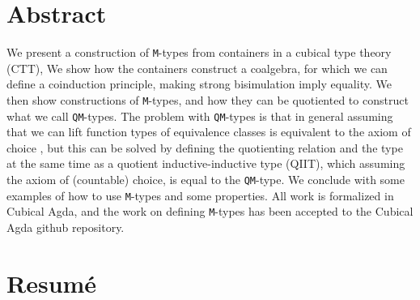 \documentclass[twoside,11pt,openright]{report}
\theoremstyle{plain} %
\theoremstyle{definition}
\theoremstyle{remark}
\begin{document}

\pagestyle{empty} 
\vspace*{\fill}
\clearpage


\pagestyle{plain}
\chapter*{Abstract}

We present a construction of \texttt{M}-types from containers in a cubical type theory (CTT), We show how the containers construct a coalgebra, for which we can define a coinduction principle, making strong bisimulation imply equality. We then show constructions of \texttt{M}-types, and how they can be quotiented to construct what we call \texttt{QM}-types. The problem with \texttt{QM}-types is that in general assuming that we can lift function types of equivalence classes is equivalent to the axiom of choice \cite{DBLP:tt-in-tt}, but this can be solved by defining the quotienting relation and the type at the same time as a quotient inductive-inductive type (QIIT), which assuming the axiom of (countable) choice, is equal to the \texttt{QM}-type. We conclude with some examples of how to use \texttt{M}-types and some properties. All work is formalized in Cubical Agda, and the work on defining \texttt{M}-types has been accepted to the Cubical Agda github repository.

\chapter*{Resum\'e}
\end{document}
